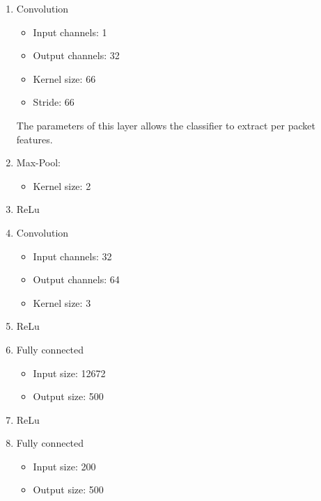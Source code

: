 \documentclass[10pt,conference,compsocconf]{IEEEtran}
\begin{document}
\begin{enumerate}
    \item Convolution
        \begin{itemize}
            \item Input channels: 1
            \item Output channels: 32
            \item Kernel size: 66
            \item Stride: 66
        \end{itemize}
        The parameters of this layer allows the classifier to extract per packet features.
    \item Max-Pool: 
        \begin{itemize}
         \item Kernel size: 2
        \end{itemize}
    \item ReLu
    \item Convolution
        \begin{itemize}
            \item Input channels: 32
            \item Output channels: 64
            \item Kernel size: 3
        \end{itemize}
    \item ReLu
    \item Fully connected
        \begin{itemize}
            \item Input size: 12672
            \item Output size: 500
        \end{itemize}
    \item ReLu
    \item Fully connected
        \begin{itemize}
            \item Input size: 200
            \item Output size: 500
        \end{itemize}
\end{enumerate}
\end{document}
